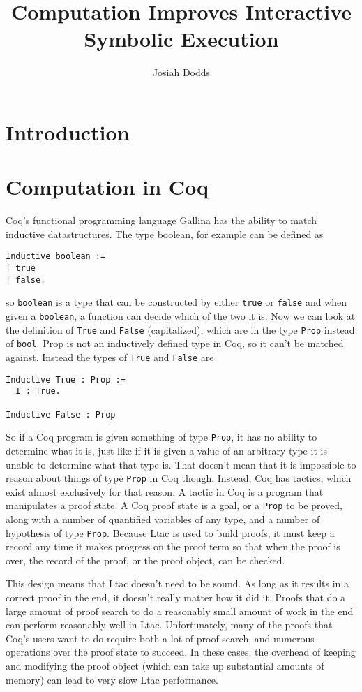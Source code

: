 \documentclass{puthesis}
\author{Josiah Dodds}
\title{Computation Improves Interactive Symbolic Execution}
\begin{document}
\chapter{Introduction}

\chapter{Computation in Coq}

Coq's functional programming language Gallina has the ability to match inductive
datastructures. The type boolean, for example can be defined as

\begin{lstlisting}
Inductive boolean :=
| true
| false.
\end{lstlisting}

so \lstinline|boolean| is a type that can be constructed by either \lstinline|true| or \lstinline|false|
and when given a \lstinline|boolean|, a function can decide which of the two it is. Now we can look 
at the definition of \lstinline|True| and \lstinline|False| (capitalized), which are in the type 
\lstinline|Prop| instead of \lstinline|bool|. Prop is not an
inductively defined type in Coq, so it can't be matched
against. Instead the types of \lstinline|True| and \lstinline|False|
are

\begin{lstlisting}
Inductive True : Prop :=
  I : True.

Inductive False : Prop
\end{lstlisting}

So if a Coq program is given something of type \lstinline|Prop|, it
has no ability to determine what it is, just like if it is given a
value of an arbitrary type it is unable to determine what that type
is. That doesn't mean that it is impossible to reason about things of
type \lstinline|Prop| in Coq though. Instead, Coq has tactics, which
exist almost exclusively for that reason. A tactic in Coq is a program
that manipulates a proof state. A Coq proof state is a goal, or a
\lstinline|Prop| to be proved, along with a number of quantified
variables of any type, and a number of hypothesis of type
\lstinline|Prop|. Because Ltac is used to build proofs, it must keep a
record any time it makes progress on the proof term so that when the
proof is over, the record of the proof, or the proof object, can be
checked.

This design means that Ltac doesn't need to be sound. As long as it
results in a correct proof in the end, it doesn't really matter how it
did it. Proofs that do a large amount of proof search to do a
reasonably small amount of work in the end can perform reasonably well
in Ltac. Unfortunately, many of the proofs that Coq's users want to do
require both a lot of proof search, and numerous operations over the
proof state to succeed. In these cases, the overhead of keeping and
modifying the
proof object (which can take up substantial amounts of memory) can
lead to very slow Ltac performance. 
\end{document}
